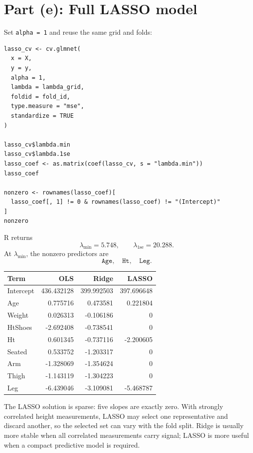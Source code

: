 ﻿\documentclass[11pt]{article}
\begin{document}
\section{Part (e): Full LASSO model}

Set \texttt{alpha = 1} and reuse the same grid and folds:

\begin{lstlisting}
lasso_cv <- cv.glmnet(
  x = X,
  y = y,
  alpha = 1,
  lambda = lambda_grid,
  foldid = fold_id,
  type.measure = "mse",
  standardize = TRUE
)

lasso_cv$lambda.min
lasso_cv$lambda.1se
lasso_coef <- as.matrix(coef(lasso_cv, s = "lambda.min"))
lasso_coef

nonzero <- rownames(lasso_coef)[
  lasso_coef[, 1] != 0 & rownames(lasso_coef) != "(Intercept)"
]
nonzero
\end{lstlisting}

R returns
\[
\lambda_{\min}=5.748,
\qquad
\lambda_{1\mathrm{se}}=20.288.
\]
At $\lambda_{\min}$, the nonzero predictors are
\[
\boxed{\texttt{Age},\quad\texttt{Ht},\quad\texttt{Leg}.}
\]

\begin{center}
\begin{tabular}{lrrr}
\toprule
\rowcolor{navy!10}\textbf{Term}&\textbf{OLS}&\textbf{Ridge}&\textbf{LASSO}\\
\midrule
Intercept&436.432128&399.992503&397.696648\\
Age&0.775716&0.473581&0.221804\\
Weight&0.026313&-0.106186&0\\
HtShoes&-2.692408&-0.738541&0\\
Ht&0.601345&-0.737116&-2.200605\\
Seated&0.533752&-1.203317&0\\
Arm&-1.328069&-1.354624&0\\
Thigh&-1.143119&-1.304223&0\\
Leg&-6.439046&-3.109081&-5.468787\\
\bottomrule
\end{tabular}
\end{center}

The LASSO solution is sparse: five slopes are exactly zero. With strongly
correlated height measurements, LASSO may select one representative and discard
another, so the selected set can vary with the fold split. Ridge is usually more
stable when all correlated measurements carry signal; LASSO is more useful when
a compact predictive model is required.
\end{document}
